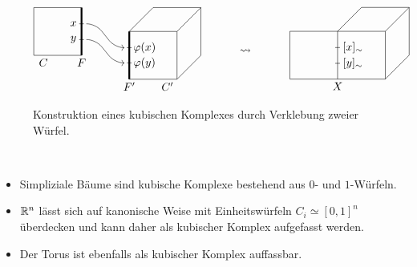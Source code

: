 \begin{figure}[h]
	\centering
	$\vcenter{\hbox{\begin{tikzpicture}[scale=1.5]
	\draw (1,0) -- (0,0) -- (0,1) -- (1,1);
	\draw [ultra thick] (1,0) -- (1,1);
	\draw (0.2,-.15) node {$C$};
	\draw (1,-.15) node {$F$};
	
	\draw (.95,0.33) -- (1.05,0.33) node[pos=-1.2] {$y$};
	\draw (.95,0.66) -- (1.05,0.66) node[pos=-1.2] {$x$};
	
	\draw (2,-.5) -- (3,-.5) -- (3,.5) -- (2,.5) -- (2.5,1) -- (3.5,1) -- (3.5,0) -- (3,-.5);
	\draw (3,.5) -- (3.5,1);
	\draw [ultra thick] (2,.5) -- (2,-.5);
	\draw (2,-.65) node {$F'$};
	\draw (2.8,-.65) node {$C'$};
	
	\draw (1.95,.16) -- (2.05,.16) node [pos=3.7] {$\varphi(x)$};
	\draw (1.95,-.16) -- (2.05,-.16) node [pos=3.7] {$\varphi(y)$};	
	
	\draw [->, rounded corners=8pt] (1.1,.66) -- (1.3,.66) -- (1.7,.16) -- (1.9,.16);
	\draw [->, rounded corners=8pt] (1.1,.33) -- (1.3,.33) -- (1.7,-.16) -- (1.9,-.16);
	\end{tikzpicture}
	\hspace{1cm}}}
	\rightsquigarrow
	\vcenter{\hbox{\hspace{1cm}
	\begin{tikzpicture}[scale=1.5]
	\draw (2,1) -- (0,1) -- (0,0) -- (1,0) -- (1,1) -- (1.5,1.5) -- (2.5,1.5) -- (2,1) -- (2,0) -- (1,0);
	\draw (2,0) -- (2.5,.5) -- (2.5,1.5);
	\draw (1,-.15) node {$X$};
	\draw (.95,.33) -- (1.05,.33) node[pos=3.7] {$[y]_\sim$};
	\draw (.95,.66) -- (1.05,.66) node[pos=3.7] {$[x]_\sim$};
	\end{tikzpicture}
	}}$
	\caption{Konstruktion eines kubischen Komplexes durch Verklebung zweier Würfel.}
\end{figure}

\begin{beispiel}
	\mbox{} \\[-1.4cm]
	\begin{itemize}
		\item Simpliziale Bäume sind kubische Komplexe bestehend aus $0$- und $1$-Würfeln.
		\item $\mathbb{R}^n$ lässt sich auf kanonische Weise mit Einheitswürfeln $C_i \simeq [0,1]^n$ überdecken und kann daher als kubischer Komplex aufgefasst werden.
		\item Der Torus ist ebenfalls als kubischer Komplex auffassbar.
	\end{itemize}
\end{beispiel}

